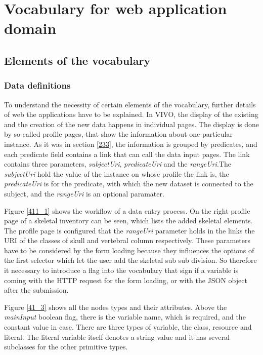 \chapter{Vocabulary for web application domain}


\section{Elements of the vocabulary}

\subsection{Data definitions}

To understand the necessity of certain elements of the vocabulary, further details of web the applications have to be explained. In VIVO, the display of the existing and the creation of the new data happens in individual pages. The display is done by so-called profile pages, that show the information about one particular instance. As it was in section \ref{233}, the information is grouped by predicates, and each predicate field contains a link that can call the data input pages. The link contains three parameters, \textit{subjectUri}, \textit{predicateUri} and the \textit{rangeUri}.The \textit{subjectUri} hold the value of the instance on whose profile the link is, the \textit{predicateUri} is for the predicate, with which the new dataset is connected to the subject, and the \textit{rangeUri} is an optional paramater.



Figure \ref{411_1} shows the workflow of a data entry process. On the right profile page of a skeletal inventory can be seen, which lists the added skeletal elements. The profile page is configured that the \textit{rangeUri} parameter holds in the links the URI of the classes of  skull and vertebral column respectively. These parameters have to be considered by the form loading because they influences the options of the first selector which let the user add the skeletal sub sub division. So therefore it necessary to introduce a flag into the vocabulary that sign if a variable is coming with the HTTP request for the form loading, or with the JSON object after the submission.

Figure \ref{41_3} shows all the nodes types and their attributes. Above the \textit{mainInput} boolean flag, there is the variable name, which is required, and the constant value in case. There are three types of variable, the class, resource and literal. The literal variable itself denotes a string value and it has several subclasses for the other primitive types.


